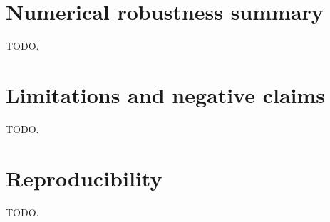 \documentclass[aps,reprint,amsmath,amssymb,nofootinbib,superscriptaddress,floatfix]{revtex4-2}
\begin{document}
\section{Numerical robustness summary}
\label{sec:robust}
TODO.

\section{Limitations and negative claims}
\label{sec:negative}
TODO.

\section{Reproducibility}
\label{sec:repro}
TODO.
\end{document}
